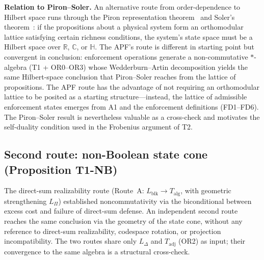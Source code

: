 \documentclass[11pt]{article}
\theoremstyle{remark}
\begin{document}
\textbf{Relation to Piron--Soler.}  An alternative route from order-dependence to Hilbert space runs through the Piron representation theorem~\cite{Piron1964} and Soler's theorem~\cite{Soler1995}: if the propositions about a physical system form an orthomodular lattice satisfying certain richness conditions, the system's state space must be a Hilbert space over $\mathbb{R}$, $\mathbb{C}$, or $\mathbb{H}$.  The APF's route is different in starting point but convergent in conclusion: enforcement operations generate a non-commutative $*$-algebra (T1 + OR0--OR3) whose Wedderburn--Artin decomposition yields the same Hilbert-space conclusion that Piron--Soler reaches from the lattice of propositions.  The APF route has the advantage of not requiring an orthomodular lattice to be posited as a starting structure---instead, the lattice of admissible enforcement states emerges from A1 and the enforcement definitions (FD1--FD6).  The Piron--Soler result is nevertheless valuable as a cross-check and motivates the self-duality condition used in the Frobenius argument of T2.




\subsection{Second route: non-Boolean state cone (Proposition T1-NB)}
\label{sec:T1NB_route}\label{sec:T1NB}


The direct-sum realizability route (Route~A: $L_{\mathrm{blk}} \to T_{\mathrm{alg}}$, with geometric strengthening $L_\Pi$) established noncommutativity via the biconditional between excess cost and failure of direct-sum defense.  An independent second route reaches the same conclusion via the geometry of the state cone, without any reference to direct-sum realizability, codespace rotation, or projection incompatibility.  The two routes share only $L_\Delta$ and $T_{\mathrm{adj}}$ (OR2) as input; their convergence to the same algebra is a structural cross-check.
\end{document}
